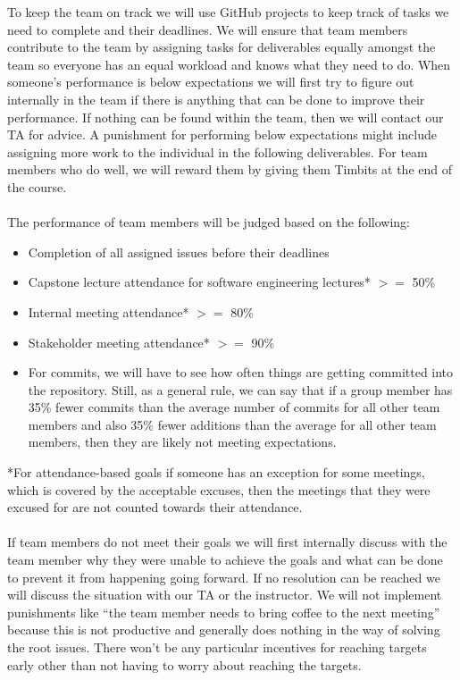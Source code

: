 \documentclass{article}
\begin{document}
To keep the team on track we will use GitHub projects to keep track of tasks we need to complete and their
deadlines. We will ensure that team members contribute to the team by assigning tasks for deliverables
equally amongst the team so everyone has an equal workload and knows what they need to do. When
someone’s performance is below expectations we will first try to figure out internally in the team if there is
anything that can be done to improve their performance. If nothing can be found within the team, then we
will contact our TA for advice. A punishment for performing below expectations might include assigning more
work to the individual in the following deliverables. For team members who do well, we will reward them by
giving them Timbits at the end of the course.\\
\\
The performance of team members will be judged based on the following:
\begin{itemize}
  \item Completion of all assigned issues before their deadlines
  \item Capstone lecture attendance for software engineering lectures* $>=$ 50\%
  \item Internal meeting attendance* $>=$ 80\%
  \item Stakeholder meeting attendance* $>=$ 90\%
  \item For commits, we will have to see how often things are getting committed into the repository. Still, as a
  general rule, we can say that if a group member has 35\% fewer commits than the average number of
  commits for all other team members and also 35\% fewer additions than the average for all other team
  members, then they are likely not meeting expectations.
\end{itemize}
*For attendance-based goals if someone has an exception for some meetings, which is covered by the
acceptable excuses, then the meetings that they were excused for are not counted towards their attendance.\\
\\
If team members do not meet their goals we will first internally discuss with the team member why they were
unable to achieve the goals and what can be done to prevent it from happening going forward. If no
resolution can be reached we will discuss the situation with our TA or the instructor. We will not implement
punishments like “the team member needs to bring coffee to the next meeting” because this is not productive
and generally does nothing in the way of solving the root issues. There won’t be any particular incentives for
reaching targets early other than not having to worry about reaching the targets.
\end{document}
